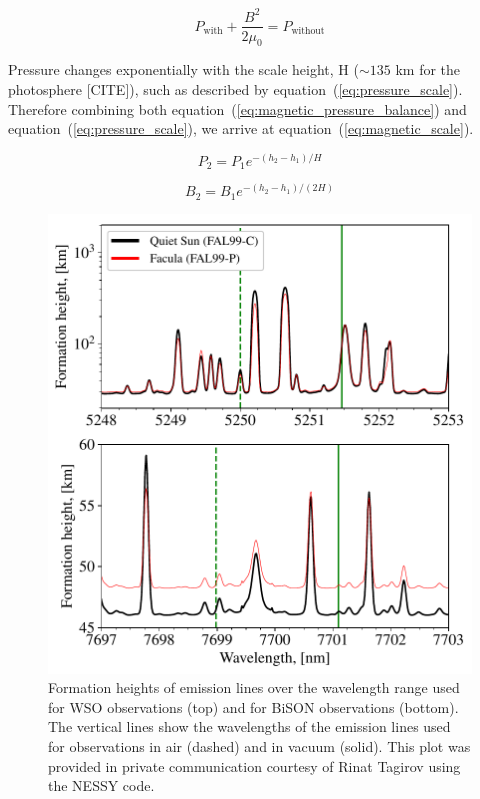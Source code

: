 \begin{equation}
P_\mathrm{with} + \frac{B^2}{2\mu_0} = P_\mathrm{without}
\label{eq:magnetic_pressure_balance}
\end{equation}

Pressure changes exponentially with the scale height, H ($\sim 135$ km for the photosphere [CITE]), such as described by equation~(\ref{eq:pressure_scale}). Therefore combining both equation~(\ref{eq:magnetic_pressure_balance}) and equation~(\ref{eq:pressure_scale}), we arrive at equation~(\ref{eq:magnetic_scale}).

\begin{equation}
P_2 = P_1 e^{ - (h_2-h_1)/H}
\label{eq:pressure_scale}
\end{equation}

\begin{equation}
B_2 = B_1 e^{ - (h_2-h_1)/(2H)}
\label{eq:magnetic_scale}
\end{equation} 


\begin{figure}[ht!]
	\centering
	\includegraphics[width=0.85\columnwidth]{fheight_high_res.eps}
	\caption{Formation heights of emission lines over the wavelength range used for WSO observations (top) and for BiSON observations (bottom). The vertical lines show the wavelengths of the emission lines used for observations in air (dashed) and in vacuum (solid). This plot was provided in private communication courtesy of Rinat Tagirov using the NESSY code.}
	\label{fig:formation_height}
\end{figure}

